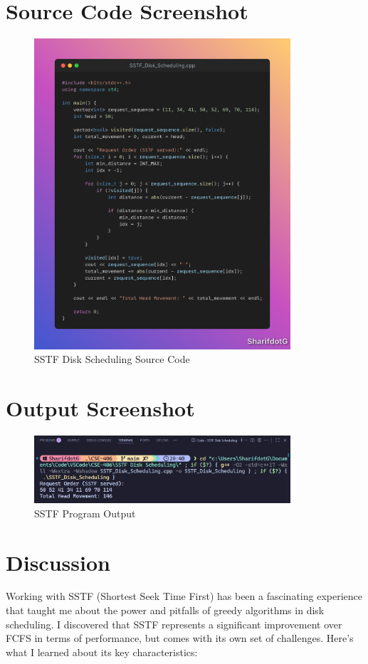 \documentclass[12pt,a4paper]{article}
\begin{document}
\section{Source Code Screenshot}
\begin{figure}[H]
  \centering
  \includegraphics[width=0.85\textwidth]{Code.png}
  \caption{SSTF Disk Scheduling Source Code}
\end{figure}

\section{Output Screenshot}
\begin{figure}[H]
  \centering
  \includegraphics[width=0.85\textwidth]{Screenshot 2025-08-21 204415.png}
  \caption{SSTF Program Output}
\end{figure}

\section{Discussion}
Working with SSTF (Shortest Seek Time First) has been a fascinating experience that taught me about the power and pitfalls of greedy algorithms in disk scheduling. I discovered that SSTF represents a significant improvement over FCFS in terms of performance, but comes with its own set of challenges. Here's what I learned about its key characteristics:
\end{document}
